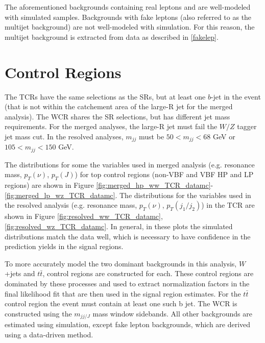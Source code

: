 The aforementioned backgrounds containing real leptons and are well-modeled with simulated samples. Backgrounds with fake leptons (also referred to as the multijet background) are not well-modeled with simulation. For this reason, the multijet background is extracted from data as described in \ref{fakelep}.

\section{Control Regions}
\label{crs}
The TCRs have the same selections as the SRs, but at least one $b$-jet in the event (that is not within the catchement area of the large-R jet for the merged analysis). The WCR shares the SR selections, but has different jet mass requirements. For the merged analyses, the large-R jet must fail the $W/Z$ tagger jet mass cut. In the resolved analyses, $m_{jj}$ must be $50 < m_{jj} < 68$ GeV or $105 < m_{jj} < 150$ GeV. 

The distributions for some the variables used in merged analysis (e.g. resonance mass, $p_{T}(\nu)$, $p_{T}(J)$) for top control regions (non-VBF and VBF HP and LP regions) are shown in Figure \ref{fig:merged_hp_ww_TCR_datamc}-\ref{fig:merged_lp_wz_TCR_datamc}. The distributions for the variables used in the resolved analysis (e.g. resonance mass, $p_{T}(\nu)$, $p_{T}(j_{1}/j_{2})$) in the TCR are shown in Figure \ref{fig:resolved_ww_TCR_datamc}, \ref{fig:resolved_wz_TCR_datamc}. In general, in these plots the simulated distributions match the data well, which is necessary to have confidence in the prediction yields in the signal regions.

To more accurately model the two dominant backgrounds in this analysis, $W$+jets and $t\bar{t}$, control regions are constructed for each. These control regions are dominated by these processes and used to extract normalization factors in the final likelihood fit that are then used in the signal region estimates. For the $t\bar{t}$ control region the event must contain at least one such b jet. The WCR is constructed using the $m_{jj/J}$ mass window sidebands. All other backgrounds are estimated using simulation, except fake lepton backgrounds, which are derived using a data-driven method.


